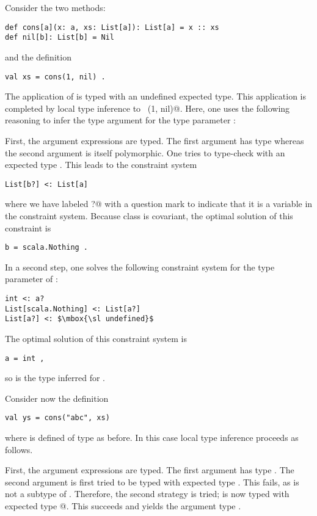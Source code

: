\example Consider the two methods:
\begin{lstlisting}
def cons[a](x: a, xs: List[a]): List[a] = x :: xs
def nil[b]: List[b] = Nil
\end{lstlisting}
and the definition
\begin{lstlisting}
val xs = cons(1, nil) .
\end{lstlisting}
The application of  is typed with an undefined expected
type. This application is completed by local type inference to 
~\lstinline@cons[int](1, nil)@. 
Here, one uses the following
reasoning to infer the type argument \lstinline@int@ for the type
parameter :

First, the argument expressions are typed. The first argument 
has type  whereas the second argument \lstinline@nil@ is
itself polymorphic. One tries to type-check \lstinline@nil@ with an
expected type . This leads to the constraint system
\begin{lstlisting}
List[b?] <: List[a]
\end{lstlisting}
where we have labeled \lstinline@b?@ with a question mark to indicate
that it is a variable in the constraint system.
Because class \lstinline@List@ is covariant, the optimal
solution of this constraint is
\begin{lstlisting}
b = scala.Nothing .
\end{lstlisting}

In a second step, one solves the following constraint system for
the type parameter  of :
\begin{lstlisting}
int <: a?
List[scala.Nothing] <: List[a?]
List[a?] <: $\mbox{\sl undefined}$
\end{lstlisting}
The optimal solution of this constraint system is
\begin{lstlisting}
a = int ,
\end{lstlisting}
so  is the type inferred for .

\example Consider now the definition  
\begin{lstlisting}
val ys = cons("abc", xs)
\end{lstlisting}
where  is defined of type  as before.
In this case local type inference proceeds as follows.

First, the argument expressions are typed. The first argument
 has type . The second argument  is
first tried to be typed with expected type . This fails,
as  is not a subtype of . Therefore, 
the second strategy is tried;  is now typed with expected type
@. This succeeds and yields the argument type
.

